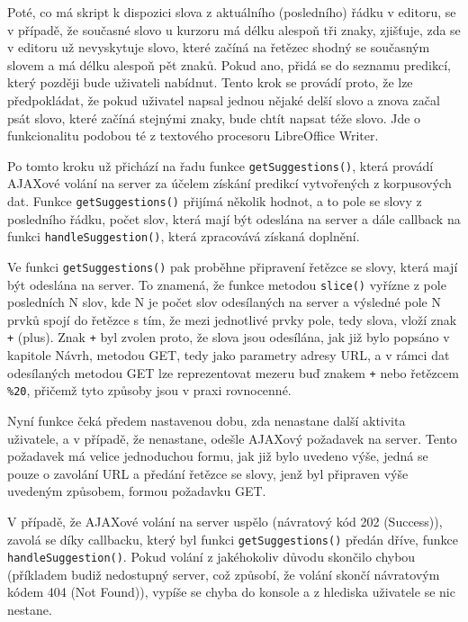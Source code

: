 \documentclass[a4paper,11pt]{article}
\begin{document}
Poté, co má skript k dispozici slova z aktuálního (posledního) řádku v editoru, se v případě, že současné slovo u kurzoru má délku alespoň tři znaky, zjišťuje, zda se v editoru už nevyskytuje slovo, které začíná na řetězec shodný se současným slovem a má délku alespoň pět znaků. Pokud ano, přidá se do seznamu predikcí, který později bude uživateli nabídnut. Tento krok se provádí proto, že lze předpokládat, že pokud uživatel napsal jednou nějaké delší slovo a znova začal psát slovo, které začíná stejnými znaky, bude chtít napsat téže slovo. Jde o funkcionalitu podobou té z textového procesoru LibreOffice Writer.

Po tomto kroku už přichází na řadu funkce {\tt getSuggestions()}, která provádí AJAXové volání na server za účelem získání predikcí vytvořených z korpusových dat. Funkce {\tt getSuggestions()} přijímá několik hodnot, a to pole se slovy z posledního řádku, počet slov, která mají být odeslána na server a dále callback na funkci {\tt handleSuggestion()}, která zpracovává získaná doplnění.

Ve funkci {\tt getSuggestions()} pak proběhne připravení řetězce se slovy, která mají být odeslána na server. To znamená, že funkce metodou {\tt slice()} vyřízne z pole posledních N slov, kde N je počet slov odesílaných na server a výsledné pole N prvků spojí do řetězce s tím, že mezi jednotlivé prvky pole, tedy slova, vloží znak {\tt +} (plus). Znak {\tt +} byl zvolen proto, že slova jsou odesílána, jak již bylo popsáno v kapitole Návrh, metodou GET, tedy jako parametry adresy URL, a v rámci dat odesílaných metodou GET lze reprezentovat mezeru buď znakem {\tt +} nebo řetězcem {\tt \%20}, přičemž tyto způsoby jsou v praxi rovnocenné.

Nyní funkce čeká předem nastavenou dobu, zda nenastane další aktivita uživatele, a v případě, že nenastane, odešle AJAXový požadavek na server. Tento požadavek má velice jednoduchou formu, jak již bylo uvedeno výše, jedná se pouze o zavolání URL a předání řetězce se slovy, jenž byl připraven výše uvedeným způsobem, formou požadavku GET.

V případě, že AJAXové volání na server uspělo (návratový kód 202 (Success)), zavolá se díky callbacku, který byl funkci {\tt getSuggestions()} předán dříve, funkce {\tt handleSuggestion()}. Pokud volání z jakéhokoliv důvodu skončilo chybou (příkladem budiž nedostupný server, což způsobí, že volání skončí návratovým kódem 404 (Not Found)), vypíše se chyba do konsole a z hlediska uživatele se nic nestane. 
\end{document}
